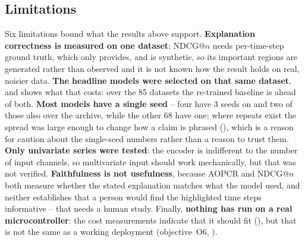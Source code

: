 \subsection{Limitations}
\label{sec:disc:limitations}

Six limitations bound what the results above support. \textbf{Explanation correctness is measured on
one dataset}: NDCG@$n$ needs per-time-step ground truth, which only \webtraffic{} provides, and
\webtraffic{} is synthetic, so its important regions are generated rather than observed and it is
not known how the result holds on real, noisier data. \textbf{The headline models were selected on
that same dataset}, and  shows what that costs: over the 85 \ucr{} datasets the
re-trained baseline is ahead of both. \textbf{Most models have a single seed} -- four have 3 seeds
on \webtraffic{} and two of those also over the \ucr{} archive, while the other 68 have one; where
repeats exist the spread was large enough to change how a claim is phrased
(), which is a reason for caution about the single-seed numbers rather than a
reason to trust them. \textbf{Only univariate series were tested}: the encoder is indifferent to the
number of input channels, so multivariate input should work mechanically, but that was not verified.
\textbf{Faithfulness is not usefulness}, because AOPCR and NDCG@$n$ both measure whether the stated
explanation matches what the model used, and neither establishes that a person would find the
highlighted time steps informative -- that needs a human study. Finally, \textbf{nothing has run on
a real microcontroller}: the cost measurements indicate that it should fit (), but
that is not the same as a working deployment (objective~O6, ).
